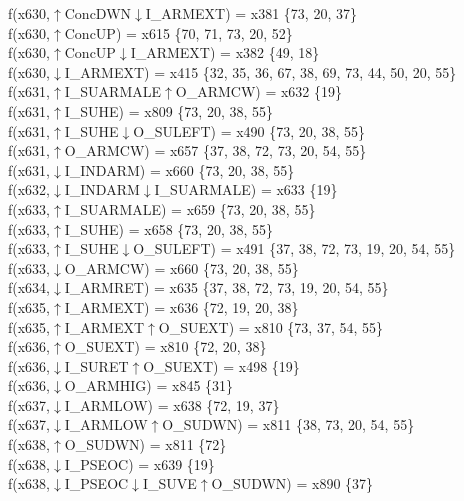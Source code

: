 f(x630,$\uparrow$ConcDWN$\downarrow$I\_ARMEXT) = x381 \{73, 20, 37\} \\  
f(x630,$\uparrow$ConcUP) = x615 \{70, 71, 73, 20, 52\} \\  
f(x630,$\uparrow$ConcUP$\downarrow$I\_ARMEXT) = x382 \{49, 18\} \\  
f(x630,$\downarrow$I\_ARMEXT) = x415 \{32, 35, 36, 67, 38, 69, 73, 44, 50, 20, 55\} \\  
f(x631,$\uparrow$I\_SUARMALE$\uparrow$O\_ARMCW) = x632 \{19\} \\  
f(x631,$\uparrow$I\_SUHE) = x809 \{73, 20, 38, 55\} \\  
f(x631,$\uparrow$I\_SUHE$\downarrow$O\_SULEFT) = x490 \{73, 20, 38, 55\} \\  
f(x631,$\uparrow$O\_ARMCW) = x657 \{37, 38, 72, 73, 20, 54, 55\} \\  
f(x631,$\downarrow$I\_INDARM) = x660 \{73, 20, 38, 55\} \\  
f(x632,$\downarrow$I\_INDARM$\downarrow$I\_SUARMALE) = x633 \{19\} \\  
f(x633,$\uparrow$I\_SUARMALE) = x659 \{73, 20, 38, 55\} \\  
f(x633,$\uparrow$I\_SUHE) = x658 \{73, 20, 38, 55\} \\  
f(x633,$\uparrow$I\_SUHE$\downarrow$O\_SULEFT) = x491 \{37, 38, 72, 73, 19, 20, 54, 55\} \\  
f(x633,$\downarrow$O\_ARMCW) = x660 \{73, 20, 38, 55\} \\  
f(x634,$\downarrow$I\_ARMRET) = x635 \{37, 38, 72, 73, 19, 20, 54, 55\} \\  
f(x635,$\uparrow$I\_ARMEXT) = x636 \{72, 19, 20, 38\} \\  
f(x635,$\uparrow$I\_ARMEXT$\uparrow$O\_SUEXT) = x810 \{73, 37, 54, 55\} \\  
f(x636,$\uparrow$O\_SUEXT) = x810 \{72, 20, 38\} \\  
f(x636,$\downarrow$I\_SURET$\uparrow$O\_SUEXT) = x498 \{19\} \\  
f(x636,$\downarrow$O\_ARMHIG) = x845 \{31\} \\  
f(x637,$\downarrow$I\_ARMLOW) = x638 \{72, 19, 37\} \\  
f(x637,$\downarrow$I\_ARMLOW$\uparrow$O\_SUDWN) = x811 \{38, 73, 20, 54, 55\} \\  
f(x638,$\uparrow$O\_SUDWN) = x811 \{72\} \\  
f(x638,$\downarrow$I\_PSEOC) = x639 \{19\} \\  
f(x638,$\downarrow$I\_PSEOC$\downarrow$I\_SUVE$\uparrow$O\_SUDWN) = x890 \{37\} \\  
